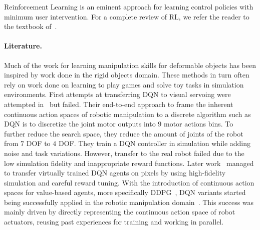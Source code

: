 \documentclass[\home/main.tex]{subfiles}
\begin{document}
Reinforcement Learning is an eminent approach for learning control policies with minimum user intervention. For a complete review of RL, we refer the reader to the textbook of~\textcite{Sutton2018}.


 
\paragraph{Literature.}
Much of the work for learning manipulation skills for deformable objects has been inspired by work done in the rigid objects domain. These methods in turn often rely on work done on learning to play games and solve toy tasks in simulation environments. First attempts at transferring DQN to visual servoing were attempted in~\autocite{Zhang2015} but failed. Their end-to-end approach to frame the inherent continuous action spaces of robotic manipulation to a discrete algorithm such as DQN is to discretize the joint motor outputs into $9$ motor actions bins. To further reduce the search space, they reduce the amount of joints of the robot from $7$ DOF to $4$ DOF. They train a DQN controller in simulation while adding noise and task variations. However, transfer to the real robot failed due to the low simulation fidelity and inappropriate reward functions. Later work~\autocite{James2016} managed to transfer virtually trained DQN agents on pixels by using high-fidelity simulation and careful reward tuning. With the introduction of continuous action spaces for value-based agents, more specifically DDPG~\autocite{Lillicrap2015}, DQN variants started being successfully applied in the robotic manipulation domain~\autocite{Gu2017}. This success was mainly driven by directly representing the continuous action space of robot actuators, reusing past experiences for training and working in parallel.
\end{document}
